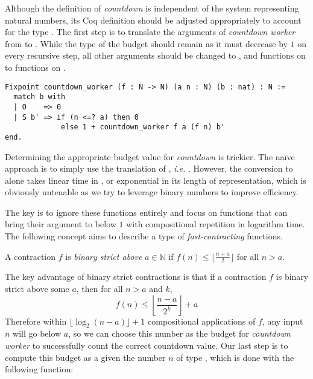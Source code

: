 Although the definition of \emph{countdown} is independent of the system representing natural numbers, its Coq definition should be adjusted appropriately to account for the type . The first step is to translate the arguments of \emph{countdown worker} from  to . While the type of the budget  should remain  as it must decrease by $1$ on every recursive step, all other  arguments should be changed to , and functions on  to functions on .
\begin{lstlisting}
Fixpoint countdown_worker (f : N -> N) (a n : N) (b : nat) : N :=
  match b with
  | O    => 0
  | S b' => if (n <=? a) then 0
             else 1 + countdown_worker f a (f n) b'
end.
\end{lstlisting}
Determining the appropriate budget value for \emph{countdown} is trickier. 
The naïve approach is to simply use the  translation of , 
\emph{i.e.} . However, the conversion to  alone 
takes linear time in , or exponential in its length of representation, 
which is obviously untenable as we try to leverage binary numbers 
to improve efficiency. 

The key is to ignore these functions entirely and focus on functions that can bring their argument to below $1$ with compositional repetition in logarithm time. The following concept aims to describe a type of \emph{fast-contracting} functions.
\begin{defn} \label{defn: bin-contraction}
	A contraction $f$ is \emph{binary strict above} $a\in \mathbb{N}$ if $f(n) \le \lfloor \frac{n + a}{2} \rfloor$ for all $n > a$.
\end{defn}
The key advantage of binary strict contractions is that if a contraction $f$ is binary strict above some $a$, then for all $n > a$ and $k$,
\begin{equation*}
f(n) \le \left\lfloor \frac{n - a}{2^k} \right\rfloor + a
\end{equation*}
Therefore within $\lfloor \log_2 (n - a) \rfloor + 1$ compositional applications of $f$, any input $n$ will go below $a$, so we can choose this number as the budget for \emph{countdown worker} to successfully count the correct countdown value. Our last step is to compute this budget as a  given the number $n$ of type , which is done with the following function:

